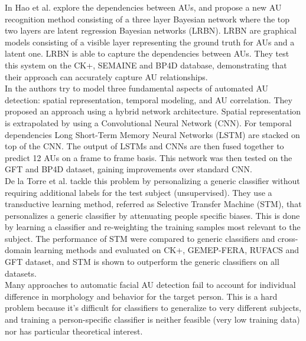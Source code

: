 In \cite{HaoWangAU} Hao et al. explore the dependencies between AUs, and propose a new AU recognition method consisting of a three layer Bayesian network where the top two layers are latent regression Bayesian networks (LRBN). LRBN are graphical models consisting of a visible layer representing the ground truth for AUs and a latent one. LRBN is able to capture the dependencies between AUs. They test this system on the CK+, SEMAINE and BP4D database, demonstrating that their approach can accurately capture AU relationships.\\
In \cite{AU_LSTM} the authors try to model three fundamental aspects of automated AU detection: spatial representation, temporal modeling, and AU correlation. They proposed an approach using a hybrid network architecture. Spatial representation is extrapolated by using a Convolutional Neural Network (CNN). For temporal dependencies Long Short-Term Memory Neural Networks (LSTM) are stacked on top of the CNN. The output of LSTMs and CNNs are then fused together to predict 12 AUs on a frame to frame basis. This network was then tested on the GFT and BP4D dataset, gaining improvements over standard CNN.\\
De la Torre et al. \cite{AU_STM} \cite{AU_STM2} tackle this problem by personalizing a generic classifier without requiring additional labels for the test subject (unsupervised). They use a transductive learning method, referred as Selective Transfer Machine (STM), that personalizes a generic classifier by attenuating people specific biases. This is done by  learning a classifier and re-weighting the training samples most relevant to the subject. The performance of STM were compared to generic classifiers and cross-domain learning methods and evaluated on CK+, GEMEP-FERA, RUFACS and GFT dataset, and STM is shown to outperform the generic classifiers on all datasets.\\ 
Many approaches to automatic facial AU detection fail to account for individual difference in morphology and behavior for the target person. This is a hard problem because it's difficult for classifiers to generalize to very different subjects, and training a person-specific classifier is neither feasible (very low training data) nor has particular theoretical interest. \\

\pagebreak



